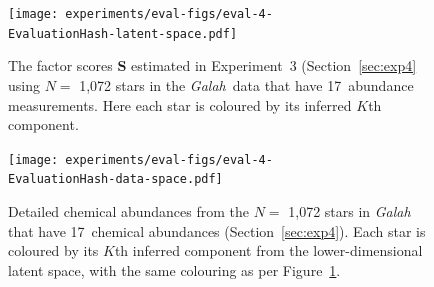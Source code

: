 \documentclass[twocolumn]{aastex62}
\newcommand{\project}[1]{\textsl{#1}}
\newcommand{\Galah}{\project{Galah}}
\newcommand{\factorscores}{\textbf{S}}
\newcommand{\ExperimentHash}{89dab}
\newcommand{\EvaluationHash}{c7d68}
\newcommand{\ExpThreeNumAbundances}{17}
\begin{document}
\begin{figure}
	\texttt{[image: experiments/eval-figs/eval-4-\\EvaluationHash-latent-space.pdf]}
	\caption{The factor scores $\factorscores$ estimated in Experiment~3 (Section~\ref{sec:exp4} using $N =$ 1,072 stars in the \Galah\ data \citep{Buder:2018} that have \ExpThreeNumAbundances\ abundance measurements. Here each star is coloured by its inferred $K$th component.}
    \label{fig:exp3-latent-space}
\end{figure}


\begin{figure}
	\texttt{[image: experiments/eval-figs/eval-4-\\EvaluationHash-data-space.pdf]}
	\caption{Detailed chemical abundances from the $N =$ 1,072 stars in \Galah\ \citep{Buder:2018} that have \ExpThreeNumAbundances\ chemical abundances (Section~\ref{sec:exp4}). Each star is coloured by its $K$th inferred component from the lower-dimensional latent space, with the same colouring as per Figure~\ref{fig:exp3-latent-space}.}
    \label{fig:exp3-data-space}
\end{figure}
\end{document}
